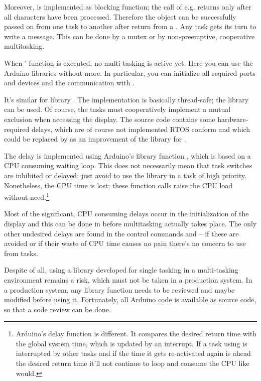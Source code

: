Moreover,  is implemented as blocking function; the call of
e.g.  returns only after all characters have been processed.
Therefore the object can be successfully passed on from one task to another
after return from a . Any task gets its turn to write a
message. This can be done by a mutex or by non-preemptive, cooperative
multitasking.

When \rtos{}' function  is executed, no multi-tasking is
active yet. Here you can use the Arduino libraries without more. In
particular, you can initialize all required ports and devices and the
communication with .

It's similar for library . The implementation is
basically thread-safe; the library can be used. Of course, the tasks must
cooperatively implement a mutual exclusion when accessing the display. The
source code contains some hardware-required delays, which are of
course not implemented RTOS conform and which could be replaced by
 as an improvement of the library for \rtos. 

The delay is implemented using Arduino's library function
, which is based on a CPU consuming waiting loop.
This does not necessarily mean that task switches are inhibited or
delayed; just avoid to use the library in a task of high priority.
Nonetheless, the CPU time is lost; these function calls raise the CPU load
without need.\footnote{Arduino's delay function 
is different. It compares the desired return time with the
global system time, which is updated by an interrupt. If a task using
 is interrupted by other tasks and if the time it gets
re-activated again is ahead the desired return time it'll not continue to
loop and consume the CPU like  would.}

Most of the significant, CPU consuming delays occur in the initialization
of the display and this can be done in  before multitasking
actually takes place. The only other undesired delays are found in the
control commands  and  -- if these are avoided or
if their waste of CPU time causes no pain there's no concern to use
 from \rtos{} tasks.

Despite of all, using a library developed for single tasking in a
multi-tasking environment remains a risk, which must not be taken in a
production system. In a production system, any library function needs to
be reviewed and maybe modified before using it. Fortunately, all Arduino
code is available as source code, so that a code review can be done.

